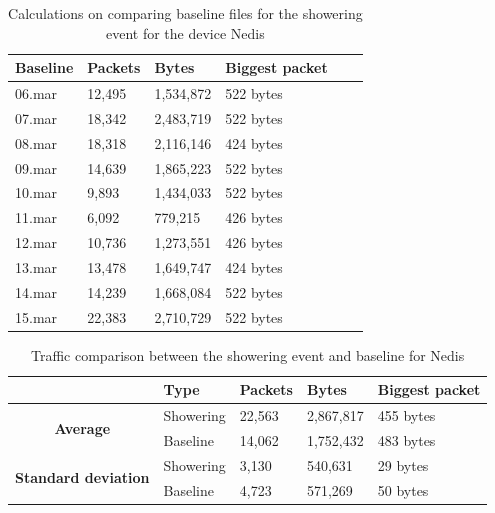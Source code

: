 \begin{table}[H]
    \centering
    \caption{Calculations on comparing baseline files for the showering event for the device Nedis}
    \begin{tabular}{|l|l|l|l|l|l|}
    \hline
        \textbf{Baseline} & \textbf{Packets} & \textbf{Bytes} & \textbf{Biggest packet} \\ \hline
        06.mar & 12,495 & 1,534,872 & 522 bytes \\ \hline
        07.mar & 18,342 & 2,483,719 & 522 bytes \\ \hline
        08.mar & 18,318 & 2,116,146 & 424 bytes \\ \hline
        09.mar & 14,639 & 1,865,223 & 522 bytes \\ \hline
        10.mar & 9,893  & 1,434,033 & 522 bytes \\ \hline
        11.mar & 6,092  & 779,215   & 426 bytes \\ \hline
        12.mar & 10,736 & 1,273,551 & 426 bytes \\ \hline
        13.mar & 13,478 & 1,649,747 & 424 bytes \\ \hline
        14.mar & 14,239 & 1,668,084 & 522 bytes \\ \hline
        15.mar & 22,383 & 2,710,729 & 522 bytes \\ \hline
    \end{tabular}
    \label{tab:NedisBaselineShowerCalculations}
\end{table}

\begin{table}[H]
    \centering
    \caption{Traffic comparison between the showering event and baseline for Nedis}
    \begin{tabular}{c|l|l|l|l|}
        \cline{2-5}
        \multicolumn{1}{l|}{}                                              & \textbf{Type} & \textbf{Packets} & \textbf{Bytes} & \textbf{Biggest packet} \\ \hline
        \multicolumn{1}{|c|}{\multirow{2}{*}{\textbf{Average}}}            & Showering         & 22,563             & 2,867,817       & 455 bytes               \\ \cline{2-5} 
        \multicolumn{1}{|c|}{}                                             & Baseline      & 14,062             & 1,752,432       & 483 bytes                \\ \hline
        \multicolumn{1}{|c|}{\multirow{2}{*}{\textbf{Standard deviation}}} & Showering         & 3,130              & 540,631         & 29 bytes                 \\ \cline{2-5} 
        \multicolumn{1}{|c|}{}                                             & Baseline      & 4,723              & 571,269         & 50 bytes               \\ \hline          
    \end{tabular}
    \label{tab:NedisComparingBaselineAndShowerCalculations}
\end{table}

